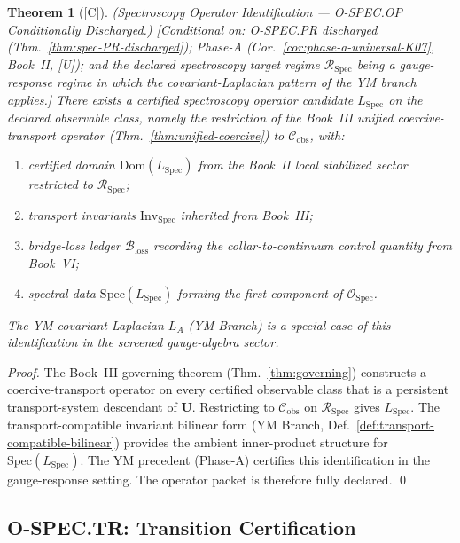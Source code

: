 \documentclass[12pt,oneside]{amsbook}
\theoremstyle{plain}
\newtheorem{theorem}{Theorem}[section]
\theoremstyle{definition}
\theoremstyle{remark}
\newcommand{\status}[1]{\textup{[#1]}}
\begin{document}
\begin{theorem}[\status{C}]\label{thm:spec-OP-discharged}
\textup{(Spectroscopy Operator Identification --- O-SPEC.OP Conditionally Discharged.)}
\textup{[Conditional on: O-SPEC.PR discharged
(Thm.~\ref{thm:spec-PR-discharged}); Phase-A
(Cor.~\ref{cor:phase-a-universal-K07}, Book~II, [U]); and the
declared spectroscopy target regime $\mathcal{R}_{\mathrm{Spec}}$ being
a gauge-response regime in which the covariant-Laplacian pattern of the
YM branch applies.]}
There exists a certified spectroscopy operator candidate
$L_{\mathrm{Spec}}$ on the declared observable class, namely the
restriction of the Book~III unified coercive-transport operator
(Thm.~\ref{thm:unified-coercive}) to $\mathcal{C}_{\mathrm{obs}}$,
with:
\begin{enumerate}[label=\textup{(\arabic*)}]
 \item certified domain $\mathrm{Dom}(L_{\mathrm{Spec}})$ from the
 Book~II local stabilized sector restricted to $\mathcal{R}_{\mathrm{Spec}}$;
 \item transport invariants $\mathrm{Inv}_{\mathrm{Spec}}$ inherited
 from Book~III;
 \item bridge-loss ledger $\mathcal{B}_{\mathrm{loss}}$ recording the
 collar-to-continuum control quantity from Book~VI;
 \item spectral data $\mathrm{Spec}(L_{\mathrm{Spec}})$ forming the
 first component of $\mathcal{O}_{\mathrm{Spec}}$.
\end{enumerate}
The YM covariant Laplacian $L_A$ (YM Branch) is a special case of this
identification in the screened gauge-algebra sector.
\end{theorem}

\begin{proof}
The Book~III governing theorem (Thm.~\ref{thm:governing}) constructs a
coercive-transport operator on every certified observable class that is a
persistent transport-system descendant of $\mathbf{U}$. Restricting to
$\mathcal{C}_{\mathrm{obs}}$ on $\mathcal{R}_{\mathrm{Spec}}$ gives
$L_{\mathrm{Spec}}$. The transport-compatible invariant bilinear form
(YM Branch, Def.~\ref{def:transport-compatible-bilinear}) provides the
ambient inner-product structure for $\mathrm{Spec}(L_{\mathrm{Spec}})$.
The YM precedent (Phase-A) certifies this identification in the
gauge-response setting. The operator packet is therefore fully declared.
\qed
\end{proof}

\subsection{O-SPEC.TR: Transition Certification}\label{sec:spec-TR}
\end{document}
